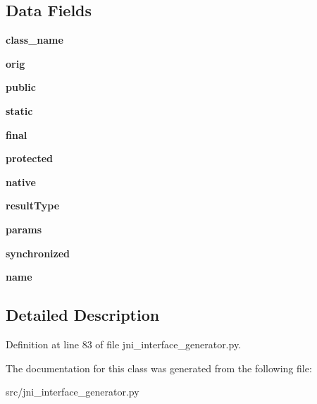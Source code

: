 \subsection*{Data Fields}
\begin{DoxyCompactItemize}
\item 
{\bfseries class\_\-name}\label{classjni__interface__generator_1_1_j_n_i_func_ae6c56f5d8afbcacdf0a09ddd688d477e}

\item 
{\bfseries orig}\label{classjni__interface__generator_1_1_j_n_i_func_a0a41e4f4273f8da94e5fca1f928e78a1}

\item 
{\bfseries public}\label{classjni__interface__generator_1_1_j_n_i_func_a10740886a5b25324d979cc6ee600482e}

\item 
{\bfseries static}\label{classjni__interface__generator_1_1_j_n_i_func_a1e6c6cd005eb5e88cc14a2a3440fdcc7}

\item 
{\bfseries final}\label{classjni__interface__generator_1_1_j_n_i_func_a4a18cac13787fa186329e6c079f54860}

\item 
{\bfseries protected}\label{classjni__interface__generator_1_1_j_n_i_func_abe56680ed0b13b42ccfd44f0e3e3515c}

\item 
{\bfseries native}\label{classjni__interface__generator_1_1_j_n_i_func_a2ff90d3ca34080dd96f0d7bc1e4dd79a}

\item 
{\bfseries resultType}\label{classjni__interface__generator_1_1_j_n_i_func_a9f2d4d5e88cd5f4f54aff928a3b43285}

\item 
{\bfseries params}\label{classjni__interface__generator_1_1_j_n_i_func_a364db6bba9370e362de2791253d40b7e}

\item 
{\bfseries synchronized}\label{classjni__interface__generator_1_1_j_n_i_func_a2b0965e3d3b6fbb8a6bcaaf77948b633}

\item 
{\bfseries name}\label{classjni__interface__generator_1_1_j_n_i_func_adb1c91f35262b6e3dd2b7b3c9d9f015a}

\end{DoxyCompactItemize}


\subsection{Detailed Description}


Definition at line 83 of file jni\_\-interface\_\-generator.py.



The documentation for this class was generated from the following file:\begin{DoxyCompactItemize}
\item 
src/jni\_\-interface\_\-generator.py\end{DoxyCompactItemize}
